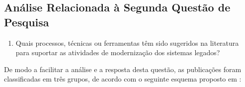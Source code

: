 \subsection{An\'{a}lise Relacionada à Segunda Questão de Pesquisa}


\begin{enumerate}[(QP2)]

\item Quais processos, técnicas ou ferramentas têm sido sugeridos 
na literatura para suportar as atividades de modernização 
dos sistemas legados?

\end{enumerate}

\vspace{0.1cm} 

De modo a facilitar a análise e a resposta desta questão, as publicações foram classificadas em três grupos, de acordo com o seguinte esquema proposto em \cite{Petersen:2008}:

